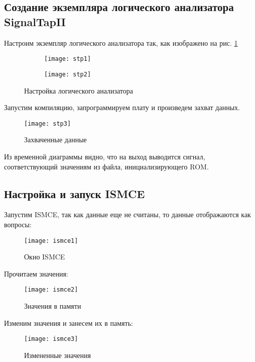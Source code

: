 \subsection{Создание экземпляра логического анализатора SignalTapII}

Настроим экземпляр логического анализатора так, как изображено на рис. \ref{fig:stp1}
\begin{figure}[H]
	\centering
	\begin{subfigure}[b]{\textwidth}
		\centering
		\texttt{[image: stp1]}
		\vspace{0.2cm}
	\end{subfigure}
	\begin{subfigure}[b]{\textwidth}
		\centering
		\texttt{[image: stp2]}
		\vspace{0.2cm}
	\end{subfigure}
	\caption{Настройка логического анализатора}
	\label{fig:stp1}
\end{figure}

Запустим компиляцию, запрограммируем плату и произведем захват данных. 
\begin{figure}[H]
	\centering
	\texttt{[image: stp3]}
	\caption{Захваченные данные}
	\label{fig:stp3}
\end{figure}

Из временной диаграммы видно, что на выход  выводится сигнал, соответствующий значениям из  файла, инициализирующего ROM.

\subsection{Настройка и запуск ISMCE}

Запустим ISMCE, так как данные еще не считаны, то данные отображаются как вопросы:
\begin{figure}[H]
	\centering
	\texttt{[image: ismce1]}
	\caption{Окно ISMCE}
\end{figure}

Прочитаем значения:
\begin{figure}[H]
	\centering
	\texttt{[image: ismce2]}
	\caption{Значения в памяти}
\end{figure}

Изменим значения и занесем их в память:
\begin{figure}[H]
	\centering
	\texttt{[image: ismce3]}
	\caption{Измененные значения}
\end{figure}

